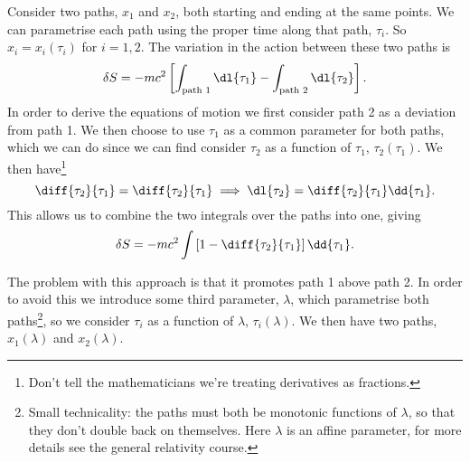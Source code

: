 \documentclass[fleqn]{NotesClass}
\begin{document}
    Consider two paths, \(x_1\) and \(x_2\), both starting and ending at the same points.
    We can parametrise each path using the proper time along that path, \(\tau_i\).
    So \(x_i = x_i(\tau_i)\) for \(i = 1, 2\).
    The variation in the action between these two paths is
    \begin{equation}
        \delta S = -mc^2 \left[ \int_{\text{path 1}} \dl{\tau_1} - \int_{\text{path 2}} \dl{\tau_2} \right].
    \end{equation}
    In order to derive the equations of motion we first consider path 2 as a deviation from path 1.
    We then choose to use \(\tau_1\) as a common parameter for both paths, which we can do since we can find consider \(\tau_2\) as a function of \(\tau_1\), \(\tau_2(\tau_1)\).
    We then have\footnote{Don't tell the mathematicians we're treating derivatives as fractions.}
    \begin{equation}
        \diff{\tau_2}{\tau_1} = \diff{\tau_2}{\tau_1} \implies \dl{\tau_2} = \diff{\tau_2}{\tau_1}\dd{\tau_1}.
    \end{equation}
    This allows us to combine the two integrals over the paths into one, giving
    \begin{equation}
        \delta S = -mc^2\int \left[ 1 - \diff{\tau_2}{\tau_1} \right]\dd{\tau_1}.
    \end{equation}
    
    The problem with this approach is that it promotes path 1 above path 2.
    In order to avoid this we introduce some third parameter, \(\lambda\), which parametrise both paths\footnote{Small technicality: the paths must both be monotonic functions of \(\lambda\), so that they don't double back on themselves. Here \(\lambda\) is an affine parameter, for more details see the general relativity course.}, so we consider \(\tau_i\) as a function of \(\lambda\), \(\tau_i(\lambda)\).
    We then have two paths, \(x_1(\lambda)\) and \(x_2(\lambda)\).
    
\end{document}
